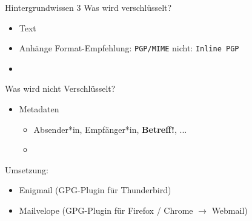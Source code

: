 \documentclass{beamer}
\begin{document}
\begin{frame}[label=bg3a]{Hintergrundwissen 3}
Was wird verschlüsselt?
\begin{itemize}
\item Text
\item Anhänge {\tiny Format-Empfehlung: \texttt{PGP/MIME} \quad nicht: \texttt{Inline PGP}}
\item[]
\end{itemize}
Was wird nicht Verschlüsselt?
\begin{itemize}
 \item Metadaten
 \begin{itemize}
  \item Absender*in, Empfänger*in, \textbf{Betreff!}, ...
  \item[]
 \end{itemize}
\end{itemize}
Umsetzung:
\begin{itemize}
 \item Enigmail (GPG-Plugin für Thunderbird)
 \item Mailvelope (GPG-Plugin für Firefox / Chrome $\rightarrow$ Webmail)
\end{itemize}


\end{frame}


\end{document}
